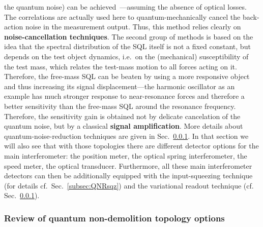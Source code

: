 the quantum noise) can be achieved~\cite{KLMTV}---assuming the
absence of optical losses. The correlations are actually used here
to quantum-mechanically cancel the back-action noise in the
measurement output. Thus, this method relies clearly on {\bf
noise-cancellation techniques}. The second group of methods is
based on the idea that the spectral distribution of the SQL itself
is not a fixed constant, but depends on the test object dynamics,
i.e.\ on the (mechanical) susceptibility of the test mass, which
relates the test-mass motion to all forces acting on it.
Therefore, the free-mass SQL can be beaten by using a more
responsive object and thus increasing its signal displacement---the harmonic
oscillator as an example has much stronger response
to near-resonance forces and therefore a better sensitivity than
the free-mass SQL around the resonance frequency. Therefore, the
sensitivity gain is obtained not by delicate cancelation of the
quantum noise, but by a classical {\bf signal amplification}. More
details about quantum-noise-reduction techniques are given in
Sec.~\ref{subsec:qndopt}. In that section we will also see that with
those topologies there are different detector options for the main
interferometer: the position meter, the optical spring
interferometer, the speed meter, the optical transducer.
Furthermore, all these main interferometer detectors can then be
additionally equipped with the input-squeezing technique (for
details cf.\ Sec.~\ref{subsec:QNRsqz})
and the variational readout technique (cf.
Sec.~\ref{subsec:qndopt}).

\FloatBarrier
\subsubsection{Review of quantum non-demolition topology options}
\label{subsec:qndopt}

